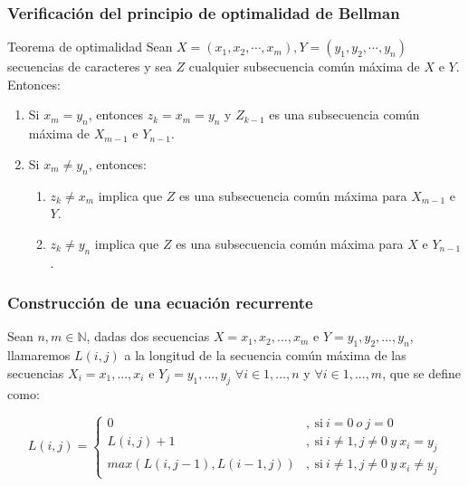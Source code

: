 \documentclass[13pt]{beamer}
\begin{document}
    \begin{frame}
		\frametitle{Verificación del principio de optimalidad de Bellman}

        \begin{alertblock}{Teorema de optimalidad}
            Sean $X=(x_1,x_2,\cdots, x_m),Y=(y_1,y_2, \cdots, y_n)$ secuencias de caracteres 
            y sea $Z$ cualquier subsecuencia común máxima 
            de $X$ e $Y$. Entonces:
            \begin{enumerate}
              \item Si $x_m = y_n$, entonces $z_k = x_m = y_n$ y $Z_{k-1}$ es una subsecuencia
              común máxima de $X_{m-1}$ e $Y_{n-1}$. 
              \item Si $x_m \neq y_n$, entonces:
              \begin{enumerate}
                \item $z_k \neq x_m$ implica que $Z$ es una subsecuencia común máxima para $X_{m-1}$ e $Y$. 
                \item $z_k \neq y_n$ implica que $Z$ es una subsecuencia común máxima para $X$ e $Y_{n-1}$. 
              \end{enumerate}
            \end{enumerate}
        \end{alertblock}
	\end{frame}

    \begin{frame}
		\frametitle{Construcción de una ecuación recurrente}
        Sean $n,m \in \mathbb{N}$, dadas dos secuencias $X = { x_1,x_2,...,x_m}$ e $Y = { y_1,y_2,...,y_n}$, llamaremos $L(i,j)$ a la 
        longitud de la secuencia común máxima de las secuencias $X_i = {x_1,...,x_i}$ e $Y_j = {y_1,...,y_j}$ $\forall i \in {1,...,n} $ y $\forall i \in {1,...,m}$, 
        que se define como:  

        \[
        L(i,j) = 
        \left \{
            \begin{aligned}
            0 &,\ \text{si} \ i = 0 \ o \ j = 0\\
            L(i,j) + 1 &,\ \text{si} \ i \neq  1 , j \neq  0 \ y \ x_i = y_j\\
            max(L(i,j-1) , L(i-1,j))&,\ \text{si} \ i \neq 1 , j \neq 0 \ y \ x_i \neq y_j
            \end{aligned}
        \right .
        \]
	\end{frame}
\end{document}
